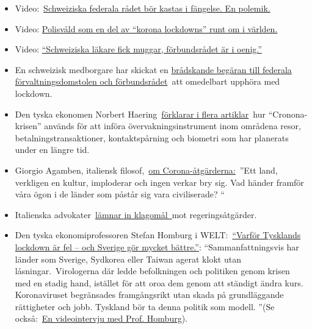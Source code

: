 \begin{itemize}
\tightlist
\item
  Video:~\href{https://www.youtube.com/watch?v=SO2JMkKtq40}{Schweiziska
  federala rådet bör kastas i fängelse. En polemik.}
\item
  Video: \href{https://www.youtube.com/watch?v=ZphK_CMUbKg}{Polisvåld
  som en del av ``korona lockdowns'' runt om i världen.}
\item
  Video:
  \href{https://www.youtube.com/watch?v=eU6IdglI-wc}{``Schweiziska
  läkare fick muggar, förbundsrådet är i oenig.''}
\item
  En schweizisk medborgare har skickat en
  \href{https://faktenb-covid-19-massnahmen.jimdofree.com/}{brådskande
  begäran till federala förvaltningsdomstolen och förbundsrådet}~att
  omedelbart upphöra med lockdown.
\item
  Den tyska ekonomen Norbert
  Haering~\href{https://norberthaering.de/}{förklarar i flera
  artiklar}~hur ``Cronona-krisen'' används för att införa
  övervakningsinstrument inom områdena resor, betalningstransaktioner,
  kontaktspårning och biometri som har planerats under en längre tid.
\item
  Giorgio Agamben, italiensk
  filosof,~\href{https://www.nzz.ch/feuilleton/coronavirus-giorgio-agamben-zum-zusammenbruch-der-demokratie-ld.1551896}{om
  Corona-åtgärderna:}~''Ett land, verkligen en kultur, imploderar och
  ingen verkar bry sig. Vad händer framför våra ögon i de länder som
  påstår sig vara civiliserade? ``
\item
  Italienska
  advokater~\href{https://www.tvprato.it/2020/04/la-camera-civile-degli-avvocati-pratesi-chiede-lannullamento-del-dpcm-del-10-aprile-e-illegittimo/}{lämnar
  in klagomål~}mot regeringsåtgärder.
\item
  Den tyska ekonomiprofessoren Stefan Homburg i
  WELT:~\href{https://www.msn.com/de-de/nachrichten/coronavirus/warum-deutschlands-lockdown-falsch-ist-\%E2\%80\%93-und-schweden-vieles-besser-macht/ar-BB12E6km}{``Varför
  Tysklands lockdown är fel -- och Sverige gör mycket bättre.''}:
  ``Sammanfattningsvis har länder som Sverige, Sydkorea eller Taiwan
  agerat klokt utan låsningar.~Virologerna där ledde befolkningen och
  politiken genom krisen med en stadig hand, istället för att oroa dem
  genom att ständigt ändra kurs. Koronaviruset begränsades framgångsrikt
  utan skada på grundläggande rättigheter och jobb. Tyskland bör ta
  denna politik som modell. ''(Se
  också:~\href{https://www.youtube.com/watch?v=Vy-VuSRoNPQ}{En
  videointervju med Prof. Homburg}).
\end{itemize}

